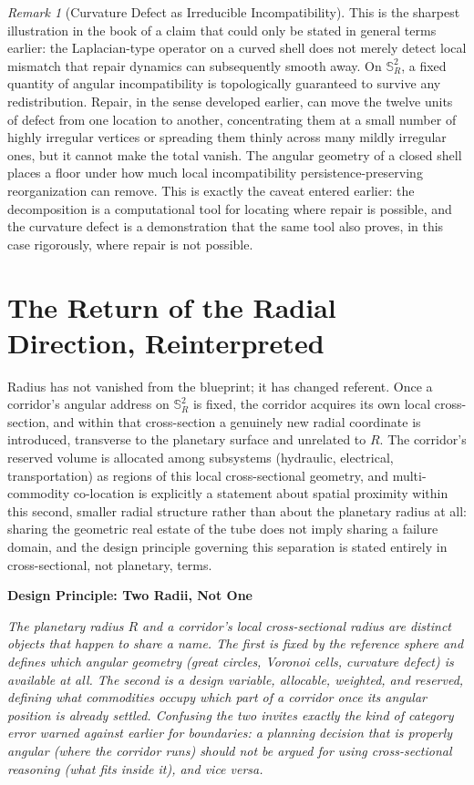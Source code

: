 \documentclass[11pt,fleqn]{book}
\numberwithin{equation}{chapter}
\newenvironment{principle}[1]
  {\begin{principleEnv}
   \noindent\textbf{Design Principle: #1}\par\smallskip\itshape}
  {\end{principleEnv}}
\theoremstyle{plain}
\theoremstyle{definition}
\theoremstyle{remark}
\newtheorem{remark}[theorem]{Remark}
\newcommand{\Sphere}{\mathbb{S}^{2}}
\begin{document}
\begin{remark}[Curvature Defect as Irreducible Incompatibility]
This is the sharpest illustration in the book of a claim that could only be stated in general terms earlier: the Laplacian-type operator on a curved shell does not merely detect local mismatch that repair dynamics can subsequently smooth away. On \(\Sphere_R\), a fixed quantity of angular incompatibility is topologically guaranteed to survive any redistribution. Repair, in the sense developed earlier, can move the twelve units of defect from one location to another, concentrating them at a small number of highly irregular vertices or spreading them thinly across many mildly irregular ones, but it cannot make the total vanish. The angular geometry of a closed shell places a floor under how much local incompatibility persistence-preserving reorganization can remove. This is exactly the caveat entered earlier: the decomposition is a computational tool for locating where repair is possible, and the curvature defect is a demonstration that the same tool also proves, in this case rigorously, where repair is not possible.
\end{remark}

\section{The Return of the Radial Direction, Reinterpreted}

Radius has not vanished from the blueprint; it has changed referent. Once a corridor's angular address on \(\Sphere_R\) is fixed, the corridor acquires its own local cross-section, and within that cross-section a genuinely new radial coordinate is introduced, transverse to the planetary surface and unrelated to \(R\). The corridor's reserved volume is allocated among subsystems (hydraulic, electrical, transportation) as regions of this local cross-sectional geometry, and multi-commodity co-location is explicitly a statement about spatial proximity within this second, smaller radial structure rather than about the planetary radius at all: sharing the geometric real estate of the tube does not imply sharing a failure domain, and the design principle governing this separation is stated entirely in cross-sectional, not planetary, terms.

\begin{principle}{Two Radii, Not One}
The planetary radius \(R\) and a corridor's local cross-sectional radius are distinct objects that happen to share a name. The first is fixed by the reference sphere and defines which angular geometry (great circles, Voronoi cells, curvature defect) is available at all. The second is a design variable, allocable, weighted, and reserved, defining what commodities occupy which part of a corridor once its angular position is already settled. Confusing the two invites exactly the kind of category error warned against earlier for boundaries: a planning decision that is properly angular (where the corridor runs) should not be argued for using cross-sectional reasoning (what fits inside it), and vice versa.
\end{principle}
\end{document}
